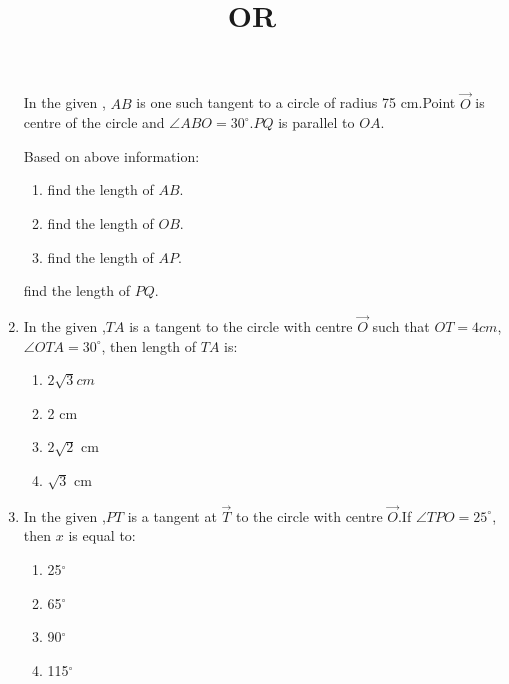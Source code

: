 \documentclass[12pt,A4 paper]{article}
\begin{document}
\begin{enumerate}
In the given , $AB$ is one such tangent to a circle of radius 75 cm.Point $\vec{ O}$ is centre of the circle and $\angle ABO= 30^{\circ}$.$PQ$ is parallel to $OA$.



\begin{figure}[H]
	        \centering
	        
		\caption{}
		\label{fig:7}
        \end{figure}



Based on above information:

           \begin{enumerate}
		   \item find the length of $AB$.
		   \item find the length of $OB$.
		   \item find the length of $AP$.
         \end{enumerate}
\begin{center}
\title{OR}
\end{center}
find the length of $PQ$.



\item In the given ,$TA$ is a tangent to the circle with centre $\vec{O}$ such that $OT=4cm$, $\angle OTA= 30 ^{\circ}$, then length of $TA$ is:
      \begin{enumerate}
          \item $2\sqrt3 cm$
          \item 2 cm
          \item $2\sqrt2$ cm
          \item $\sqrt3$ cm
      \end{enumerate}




  \begin{figure}[H]
	\centering
	
	\caption{}
	\label{fig:8}
  \end{figure}





\item In the given ,$PT$ is a tangent at $\vec{T}$ to the circle with centre $\vec{O}$.If $\angle TPO=25^{\circ}$, then $x$ is equal to:
   \begin{enumerate}
       \item 25$^{\circ}$
       \item 65$^{\circ}$  
       \item 90$^{\circ}$
       \item 115$^{\circ}$
       

\end{enumerate}
\end{enumerate}
\end{document}
